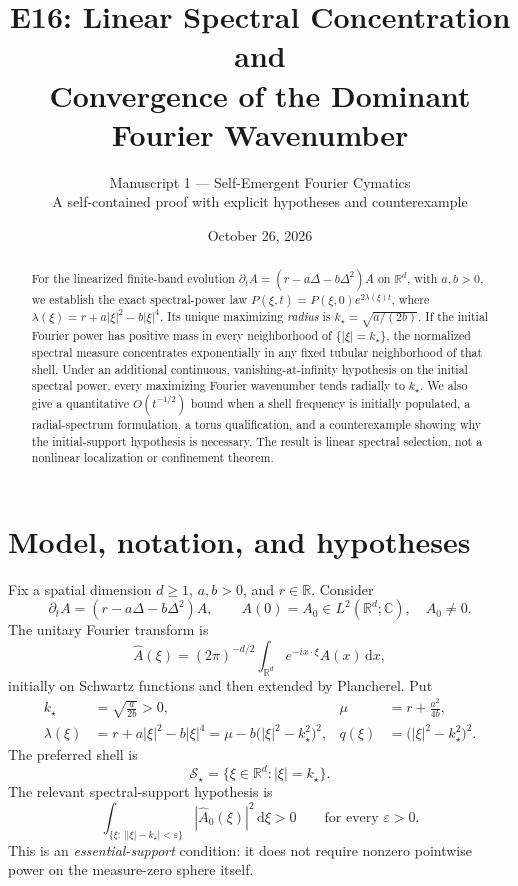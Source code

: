 \documentclass[11pt]{article}
\title{E16: Linear Spectral Concentration and\\
Convergence of the Dominant Fourier Wavenumber}
\author{Manuscript 1 --- Self-Emergent Fourier Cymatics\\
\small A self-contained proof with explicit hypotheses and counterexample}
\date{October 26, 2026}
\theoremstyle{remark}
\newcommand{\R}{\mathbb R}
\newcommand{\C}{\mathbb C}
\newcommand{\Sstar}{\mathcal S_\star}
\newcommand{\abs}[1]{\left\lvert#1\right\rvert}
\newcommand{\dd}{\,\mathrm d}
\begin{document}
\maketitle

\begin{abstract}
For the linearized finite-band evolution
$\partial_t A=(r-a\Delta-b\Delta^2)A$ on $\R^d$, with $a,b>0$,
we establish the exact spectral-power law
$P(\xi,t)=P(\xi,0)e^{2\lambda(\xi)t}$, where
$\lambda(\xi)=r+a\abs{\xi}^2-b\abs{\xi}^4$.
Its unique maximizing \emph{radius} is
$k_\star=\sqrt{a/(2b)}$. If the initial Fourier power has positive
mass in every neighborhood of $\{\abs\xi=k_\star\}$, the normalized
spectral measure concentrates exponentially in any fixed tubular
neighborhood of that shell. Under an additional continuous,
vanishing-at-infinity hypothesis on the initial spectral power,
every maximizing Fourier wavenumber tends radially to $k_\star$.
We also give a quantitative $O(t^{-1/2})$ bound when a shell frequency
is initially populated, a radial-spectrum formulation, a torus
qualification, and a counterexample showing why the initial-support
hypothesis is necessary. The result is linear spectral selection,
not a nonlinear localization or confinement theorem.
\end{abstract}

\section{Model, notation, and hypotheses}
Fix a spatial dimension $d\ge 1$, $a,b>0$, and $r\in\R$.
Consider
\begin{equation}\label{eq:flow}
 \partial_t A=(r-a\Delta-b\Delta^2)A,
 \qquad A(0)=A_0\in L^2(\R^d;\C),\quad A_0\ne0.
\end{equation}
The unitary Fourier transform is
\begin{equation}\label{eq:fourier}
 \widehat A(\xi)=(2\pi)^{-d/2}
 \int_{\R^d}e^{-ix\cdot\xi}A(x)\dd x,
\end{equation}
initially on Schwartz functions and then extended by Plancherel.
Put
\begin{align}
 k_\star&=\sqrt{\frac{a}{2b}}>0,
 &\mu&=r+\frac{a^2}{4b}, \label{eq:params}\\
 \lambda(\xi)&=r+a\abs{\xi}^2-b\abs{\xi}^4
 =\mu-b\bigl(\abs{\xi}^2-k_\star^2\bigr)^2,
 &q(\xi)&=\bigl(\abs{\xi}^2-k_\star^2\bigr)^2.
 \label{eq:lambda}
\end{align}
The preferred shell is
\[
 \Sstar=\{\xi\in\R^d:\abs{\xi}=k_\star\}.
\]
The relevant spectral-support hypothesis is
\begin{equation}\label{eq:H}
 \tag{H}
 \int_{\{\xi:\,\lvert\abs\xi-k_\star\rvert<\varepsilon\}}
 \abs{\widehat A_0(\xi)}^2\dd\xi>0
 \qquad\text{for every }\varepsilon>0.
\end{equation}
This is an \emph{essential-support} condition: it does not require
nonzero pointwise power on the measure-zero sphere itself.
\end{document}
